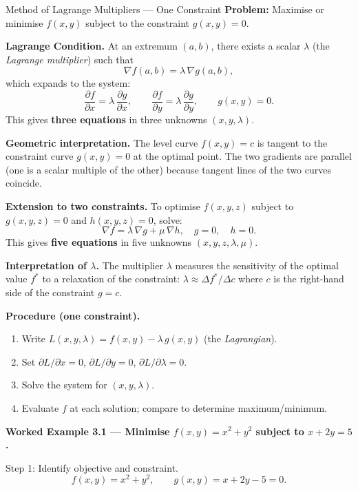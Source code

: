 \documentclass[12pt,a4paper]{article}
\begin{document}
\begin{infobox}{Method of Lagrange Multipliers --- One Constraint}
\textbf{Problem:} Maximise or minimise $f(x,y)$ subject to the constraint $g(x,y) = 0$.

\textbf{Lagrange Condition.} At an extremum $(a,b)$, there exists a scalar $\lambda$ (the \emph{Lagrange multiplier}) such that
\[
  \nabla f(a,b) = \lambda\, \nabla g(a,b),
\]
which expands to the system:
\[
  \frac{\partial f}{\partial x} = \lambda\,\frac{\partial g}{\partial x}, \qquad
  \frac{\partial f}{\partial y} = \lambda\,\frac{\partial g}{\partial y}, \qquad
  g(x,y) = 0.
\]
This gives \textbf{three equations} in three unknowns $(x, y, \lambda)$.

\textbf{Geometric interpretation.} The level curve $f(x,y) = c$ is tangent to the constraint curve $g(x,y) = 0$ at the optimal point. The two gradients are parallel (one is a scalar multiple of the other) because tangent lines of the two curves coincide.

\textbf{Extension to two constraints.} To optimise $f(x,y,z)$ subject to $g(x,y,z)=0$ and $h(x,y,z)=0$, solve:
\[
  \nabla f = \lambda\,\nabla g + \mu\,\nabla h, \quad g = 0, \quad h = 0.
\]
This gives \textbf{five equations} in five unknowns $(x,y,z,\lambda,\mu)$.

\textbf{Interpretation of $\lambda$.} The multiplier $\lambda$ measures the sensitivity of the optimal value $f^{*}$ to a relaxation of the constraint: $\lambda \approx \Delta f^{*} / \Delta c$ where $c$ is the right-hand side of the constraint $g = c$.

\textbf{Procedure (one constraint).}
\begin{enumerate}
  \item Write $L(x,y,\lambda) = f(x,y) - \lambda\,g(x,y)$ (the \emph{Lagrangian}).
  \item Set $\partial L/\partial x = 0$, $\partial L/\partial y = 0$, $\partial L/\partial \lambda = 0$.
  \item Solve the system for $(x, y, \lambda)$.
  \item Evaluate $f$ at each solution; compare to determine maximum/minimum.
\end{enumerate}
\end{infobox}

\textbf{Worked Example 3.1 --- Minimise $f(x,y) = x^{2} + y^{2}$ subject to $x + 2y = 5$.}

Step 1: Identify objective and constraint.
\[
  f(x,y) = x^{2} + y^{2}, \qquad g(x,y) = x + 2y - 5 = 0.
\]
\end{document}
